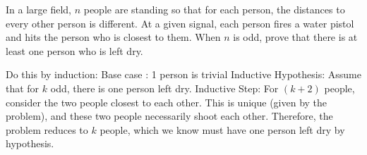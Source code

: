 \question In a large field, $n$ people are standing so that for each 
person, the distances to every other person is different. At a given 
signal, each person fires a water pistol and hits the person who is 
closest to them. When $n$ is odd, prove that there is at least one 
person who is left dry.

\begin{solution}
Do this by induction: \newline
Base case : 1 person is trivial\newline
Inductive Hypothesis: Assume that for $k$ odd, there is one person 
left dry.\newline
Inductive Step: For $(k+2)$ people, consider the two people closest 
to each other. This is unique (given by the problem), and these two 
people necessarily shoot each other. Therefore, the problem reduces 
to $k$ people, which we know must have one person left dry by 
hypothesis.
\end{solution}